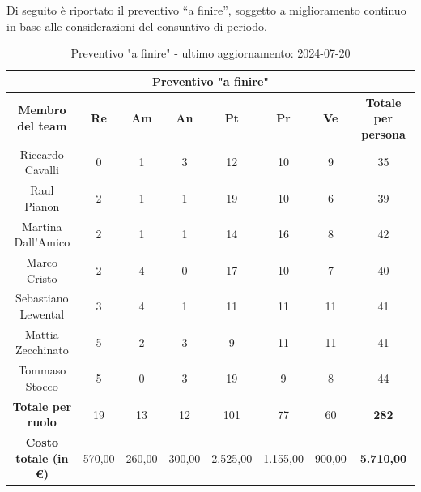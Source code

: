 \begin{minipage}{\textwidth}
  Di seguito è riportato il preventivo “a finire”, soggetto a miglioramento continuo in base alle considerazioni del consuntivo di periodo.
\begin{table}[H]
  \centering
  \begin{adjustbox}{max width=\textwidth}
  \begin{tabular}{|c|c|c|c|c|c|c|c|}
    \hline
    \multicolumn{8}{|c|}{\textbf{Preventivo "a finire"}} \\
    \hline
    \textbf{Membro del team} & \textbf{Re} & \textbf{Am} & \textbf{An} & \textbf{Pt} & \textbf{Pr} & \textbf{Ve} & \textbf{Totale per persona} \\
    \hline
    Riccardo Cavalli & 0 & 1 & 3 & 12 & 10 & 9 & 35 \\
    \hline
    Raul Pianon & 2 & 1 & 1 & 19 & 10 & 6 & 39 \\
    \hline
    Martina Dall'Amico & 2 & 1 & 1 & 14 & 16 & 8 & 42 \\
    \hline
    Marco Cristo & 2 & 4 & 0 & 17 & 10 & 7 & 40 \\
    \hline
    Sebastiano Lewental & 3 & 4 & 1 & 11 & 11 & 11 & 41 \\
    \hline
    Mattia Zecchinato & 5 & 2 & 3 & 9 & 11 & 11 & 41 \\
    \hline
    Tommaso Stocco & 5 & 0 & 3 & 19 & 9 & 8 & 44 \\
    \hline
    \textbf{Totale per ruolo} & 19 & 13 & 12 & 101 & 77 & 60 & \textbf{282} \\
    \hline
    \textbf{Costo totale (in €)} & 570,00 & 260,00 & 300,00 & 2.525,00 & 1.155,00 & 900,00 & \textbf{5.710,00} \\
    \hline
  \end{tabular}
  \end{adjustbox}
  \caption{Preventivo "a finire" - ultimo aggiornamento: 2024-07-20}\label{tab:preventivo-a-finire}
\end{table}
\end{minipage}
